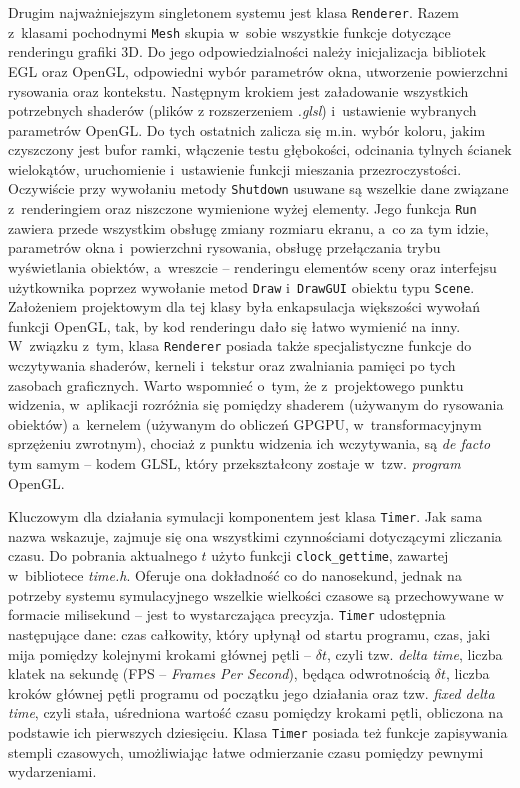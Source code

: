 	Drugim najważniejszym singletonem systemu jest klasa \texttt{Renderer}. Razem z~klasami pochodnymi \texttt{Mesh} skupia w~sobie wszystkie funkcje dotyczące renderingu grafiki 3D. Do jego odpowiedzialności należy inicjalizacja bibliotek EGL oraz OpenGL, odpowiedni wybór parametrów okna, utworzenie powierzchni rysowania oraz kontekstu. Następnym krokiem jest załadowanie wszystkich potrzebnych shaderów (plików z rozszerzeniem \emph{.glsl}) i~ustawienie wybranych parametrów OpenGL. Do tych ostatnich zalicza się m.in. wybór koloru, jakim czyszczony jest bufor ramki, włączenie testu głębokości, odcinania tylnych ścianek wielokątów, uruchomienie i~ustawienie funkcji mieszania przezroczystości. Oczywiście przy wywołaniu metody \texttt{Shutdown} usuwane są wszelkie dane związane z~renderingiem oraz niszczone wymienione wyżej elementy. Jego funkcja \texttt{Run} zawiera przede wszystkim obsługę zmiany rozmiaru ekranu, a~co za tym idzie, parametrów okna i~powierzchni rysowania, obsługę przełączania trybu wyświetlania obiektów, a~wreszcie -- renderingu elementów sceny oraz interfejsu użytkownika poprzez wywołanie metod \texttt{Draw} i~\texttt{DrawGUI} obiektu typu \texttt{Scene}. Założeniem projektowym dla tej klasy była enkapsulacja większości wywołań funkcji OpenGL, tak, by kod renderingu dało się łatwo wymienić na inny. W~związku z~tym, klasa \texttt{Renderer} posiada także specjalistyczne funkcje do wczytywania shaderów, kerneli i~tekstur oraz zwalniania pamięci po tych zasobach graficznych. Warto wspomnieć o~tym, że z~projektowego punktu widzenia, w~aplikacji rozróżnia się pomiędzy shaderem (używanym do rysowania obiektów) a~kernelem (używanym do obliczeń GPGPU, w~transformacyjnym sprzężeniu zwrotnym), chociaż z punktu widzenia ich wczytywania, są \emph{de facto} tym samym -- kodem GLSL, który przekształcony zostaje w~tzw. \emph{program} OpenGL. 
	
	Kluczowym dla działania symulacji komponentem jest klasa \texttt{Timer}. Jak sama nazwa wskazuje, zajmuje się ona wszystkimi czynnościami dotyczącymi zliczania czasu. Do pobrania aktualnego \(t\) użyto funkcji \texttt{clock\_gettime}, zawartej w~bibliotece \emph{time.h}. Oferuje ona dokładność co do nanosekund, jednak na potrzeby systemu symulacyjnego wszelkie wielkości czasowe są przechowywane w formacie milisekund -- jest to wystarczająca precyzja. \texttt{Timer} udostępnia następujące dane: czas całkowity, który upłynął od startu programu, czas, jaki mija pomiędzy kolejnymi krokami głównej pętli -- \(\delta t \), czyli tzw. \emph{delta time}, liczba klatek na sekundę (FPS -- \emph{Frames Per Second}), będąca odwrotnością \(\delta t \), liczba kroków głównej pętli programu od początku jego działania oraz tzw. \emph{fixed delta time}, czyli stała, uśredniona wartość czasu pomiędzy krokami pętli, obliczona na podstawie ich pierwszych dziesięciu. Klasa \texttt{Timer} posiada też funkcje zapisywania stempli czasowych, umożliwiając łatwe odmierzanie czasu pomiędzy pewnymi wydarzeniami.
	
